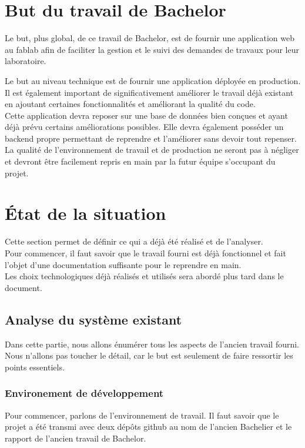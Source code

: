 \documentclass[
    iai, %
    il, %
]{heig-tb}
\begin{document}
\section{But du travail de Bachelor}
Le but, plus global, de ce travail de Bachelor, est de fournir une application web au \Gls{fablab} afin de faciliter la gestion et le suivi des demandes de travaux pour leur laboratoire.

Le but au niveau technique est de fournir une application déployée en production.\\
Il est également important de significativement améliorer le travail déjà existant en ajoutant certaines fonctionnalités et améliorant la qualité du code.\\
Cette application devra reposer sur une base de données bien conçues et ayant déjà prévu certains améliorations possibles. Elle devra également posséder un \Gls{backend} propre permettant de reprendre et l'améliorer sans devoir tout repenser.\\
La qualité de l'environnement de travail et de production ne seront pas à négliger et devront être facilement repris en main par la futur équipe s'occupant du projet.

\section{État de la situation}
Cette section permet de définir ce qui a déjà été réalisé et de l'analyser.\\
Pour commencer, il faut savoir que le travail fourni est déjà fonctionnel et fait l'objet d'une documentation suffisante pour le reprendre en main.\\
Les choix technologiques déjà réalisés et utilisés sera abordé plus tard dans le document.

\subsection{Analyse du système existant}
Dans cette partie, nous allons énumérer tous les aspects de l'ancien travail fourni. Nous n'allons
pas toucher le détail, car le but est seulement de faire ressortir les points essentiels.

\subsubsection{Environement de développement}
Pour commencer, parlons de l'environnement de travail. Il faut savoir que le projet a été transmi avec deux dépôts \Gls{github} au nom de l'ancien Bachelier et le rapport de l'ancien travail de Bachelor.
\end{document}
